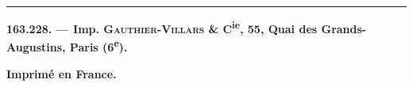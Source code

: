 \noindent\rule{\linewidth}{0.4pt}

\textbf{163.228. --- Imp. \textsc{Gauthier-Villars} \& C\textsuperscript{ie}, 55, Quai des Grands-Augustins, Paris (6\textsuperscript{e}).}

\centerline{\textbf{Imprimé en France.}}
